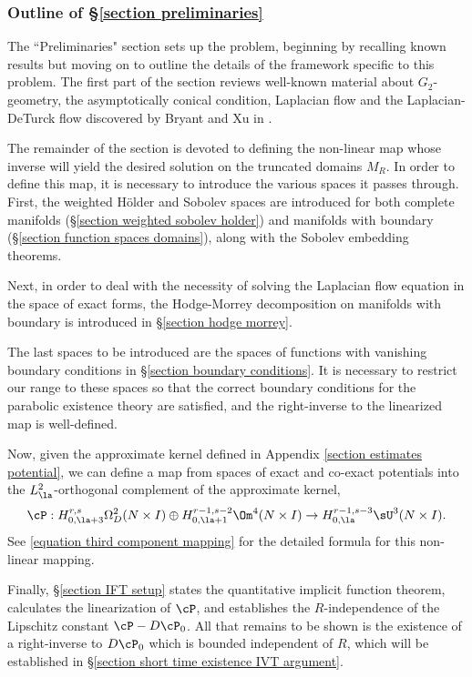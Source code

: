\documentclass[hidelinks, 12pt, oneside, reqno]{amsart}
\begin{document}
\subsubsection{Outline of \S \ref{section preliminaries}}

The ``Preliminaries" section sets up the problem, beginning by recalling known results but moving on to outline the details of the framework specific to this problem. The first part of the section reviews well-known material about $G_2$-geometry, the asymptotically conical condition, Laplacian flow and the Laplacian-DeTurck flow discovered by Bryant and Xu in \cite{BryantXu}. 

The remainder of the section is devoted to defining the non-linear map whose inverse will yield the desired solution on the truncated domains $M_R$. In order to define this map, it is necessary to introduce the various spaces it passes through. First, the weighted H\"older and Sobolev spaces are introduced for both complete manifolds (\S \ref{section weighted sobolev holder}) and manifolds with boundary (\S \ref{section function spaces domains}), along with the Sobolev embedding theorems. 

Next, in order to deal with the necessity of solving the Laplacian flow equation in the space of exact forms, the Hodge-Morrey decomposition on manifolds with boundary is introduced in \S \ref{section hodge morrey}. 

The last spaces to be introduced are the spaces of functions with vanishing boundary conditions in \S \ref{section boundary conditions}. It is necessary to restrict our range to these spaces so that the correct boundary conditions for the parabolic existence theory are satisfied, and the right-inverse to the linearized map is well-defined. 

Now, given the approximate kernel defined in Appendix \ref{section estimates potential}, we can define a map from spaces of exact and co-exact potentials into the $L^2_\la$-orthogonal complement of the approximate kernel, 
\[
\cP : H^{r,s}_{0,\la+3} \Omega^2_D(N \times I) \oplus H_{0,\la+1}^{r-1,s-2}\Om^4 (N \times I)  \rightarrow H_{0,\la}^{r-1,s-3}\sU^3(N \times I).
\]
See \eqref{equation third component mapping} for the detailed formula for this non-linear mapping.

Finally, \S \ref{section IFT setup} states the quantitative implicit function theorem, calculates the linearization of $\cP$, and establishes the $R$-independence of the Lipschitz constant $\cP - D\cP_0$. All that remains to be shown is the existence of a right-inverse to $D\cP_0$ which is bounded independent of $R$, which will be established in \S \ref{section short time existence IVT argument}. 
\end{document}
